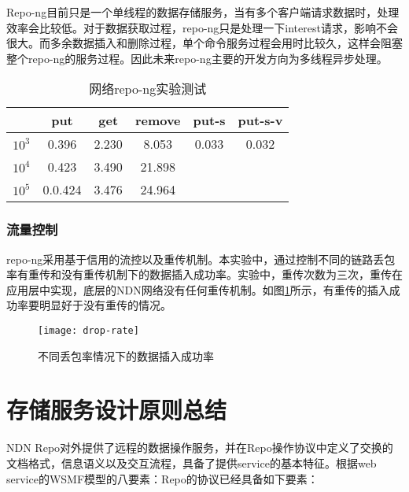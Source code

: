 Repo-ng目前只是一个单线程的数据存储服务，当有多个客户端请求数据时，处理效率会比较低。对于数据获取过程，repo-ng只是处理一下interest请求，影响不会很大。而多余数据插入和删除过程，单个命令服务过程会用时比较久，这样会阻塞整个repo-ng的服务过程。因此未来repo-ng主要的开发方向为多线程异步处理。

\begin{table}
\centering
\caption{网络repo-ng实验测试}
\label{tab:repo-ng-network}
\begin{tabular}{ | c | c | c | c | c | c | }
    \hline
           & put & get & remove & put-s & put-s-v \\ \hline
    $10^3$ & 0.396 & 2.230 & 8.053 & 0.033 & 0.032  \\ \hline
    $10^4$ & 0.423 & 3.490 & 21.898 & & \\ \hline
    $10^5$ & 0.0.424 & 3.476 & 24.964 & & \\ \hline
\end{tabular}
\end{table}

\subsubsection{流量控制}
repo-ng采用基于信用的流控以及重传机制。本实验中，通过控制不同的链路丢包率有重传和没有重传机制下的数据插入成功率。实验中，重传次数为三次，重传在应用层中实现，底层的NDN网络没有任何重传机制。如图\ref{fig:drop-rate}所示，有重传的插入成功率要明显好于没有重传的情况。

\begin{figure}[H]
  \centering
  \texttt{[image: drop-rate]}
  \caption{不同丢包率情况下的数据插入成功率}
  \label{fig:drop-rate}
\end{figure}

\section{存储服务设计原则总结}
NDN Repo对外提供了远程的数据操作服务，并在Repo操作协议中定义了交换的文档格式，信息语义以及交互流程，具备了提供service的基本特征。根据web service的WSMF模型的八要素：Repo的协议已经具备如下要素：

